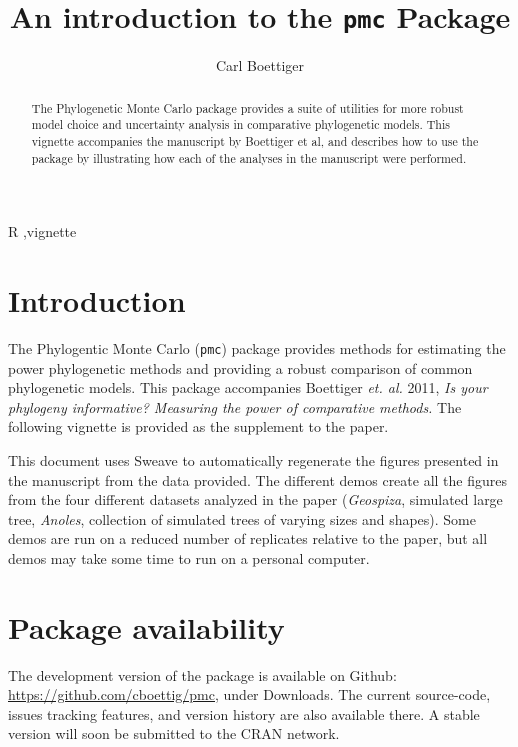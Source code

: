 \documentclass{elsarticle}
\begin{document}
\begin{frontmatter}
  \title{An introduction to the \texttt{pmc} Package}
  \author[davis]{Carl Boettiger}
  \address[davis]{Center for Population Biology, University of California, Davis, United States}

  \begin{abstract}
  The Phylogenetic Monte Carlo package provides a suite of utilities for more robust model choice and uncertainty analysis in comparative phylogenetic models.  This vignette accompanies the manuscript by Boettiger et al, and describes how to use the package by illustrating how each of the analyses in the manuscript were performed.  
  \end{abstract}

  \begin{keyword}
   R  \sep vignette
   \end{keyword}
 \end{frontmatter}

\section{Introduction}
The Phylogentic Monte Carlo (\texttt{pmc}) package provides methods for estimating the power phylogenetic methods and providing a robust comparison of common phylogenetic models.  This package accompanies Boettiger \emph{et. al.} 2011, \emph{Is your phylogeny informative? Measuring the power of comparative methods.}  The following vignette is provided as the supplement to the paper.  

This document uses Sweave to automatically regenerate the figures presented in the manuscript from the data provided. The different demos create all the figures from the four different datasets analyzed in the paper (\emph{Geospiza}, simulated large tree, \emph{Anoles}, collection of simulated trees of varying sizes and shapes).  Some demos are run on a reduced number of replicates relative to the paper, but all demos may take some time to run on a personal computer.  

\section{Package availability}
The development version of the package is available on Github: \href{https://github.com/cboettig/pmc}{https://github.com/cboettig/pmc}, under Downloads.  The current source-code, issues tracking features, and version history are also available there.  A stable version will soon be submitted to the CRAN network.  
\end{document}
